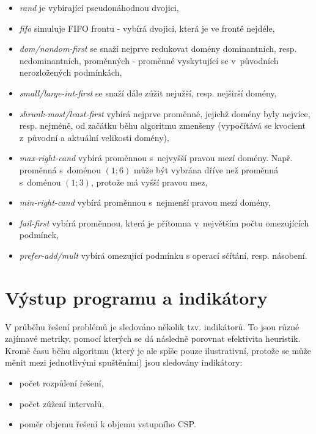 \begin{itemize}
  \item \emph{rand} je  vybírající pseudonáhodnou dvojici,
  \item \emph{fifo} simuluje FIFO frontu - vybírá dvojici, která je ve frontě nejdéle,
  \item \emph{dom/nondom-first} \cite{feiten10} se snaží nejprve redukovat domény dominantních, resp. nedominantních, proměnných - proměnné vyskytující se v~původních nerozložených podmínkách,
  \item \emph{small/large-int-first} \cite{feiten10} se snaží dále zúžit nejužší, resp. nejširší domény,
  \item \emph{shrunk-most/least-first} \cite{feiten10} vybírá nejprve proměnné, jejichž domény byly nejvíce, resp. nejméně, od začátku běhu algoritmu zmenšeny (vypočítává se kvocient z~původní a aktuální velikosti domény),
  \item \emph{max-right-cand} \cite{feiten10} vybírá proměnnou s~nejvyšší pravou mezí domény. Např. proměnná s~doménou $(1;6)$ může být vybrána dříve než proměnná s~doménou $(1;3)$, protože má vyšší pravou mez,
  \item \emph{min-right-cand} \cite{feiten10} vybírá proměnnou s~nejmenší pravou mezí domény,
  \item \emph{fail-first} vybírá proměnnou, která je přítomna v~největším počtu omezujících podmínek,
  \item \emph{prefer-add/mult} vybírá omezující podmínku s operací sčítání, resp. násobení.
\end{itemize}

\section{Výstup programu a indikátory}
\label{ch:indicators}
V průběhu řešení problémů je sledováno několik tzv. indikátorů. To jsou různé zajímavé metriky, pomocí kterých se dá následně porovnat efektivita heuristik. Kromě času běhu algoritmu (který je ale spíše pouze ilustrativní, protože se může měnit mezi jednotlivými spuštěními) jsou sledovány indikátory:

\begin{itemize}
    \item počet rozpůlení řešení,
    \item počet zúžení intervalů,
    \item poměr objemu řešení k objemu vstupního CSP.
\end{itemize}





